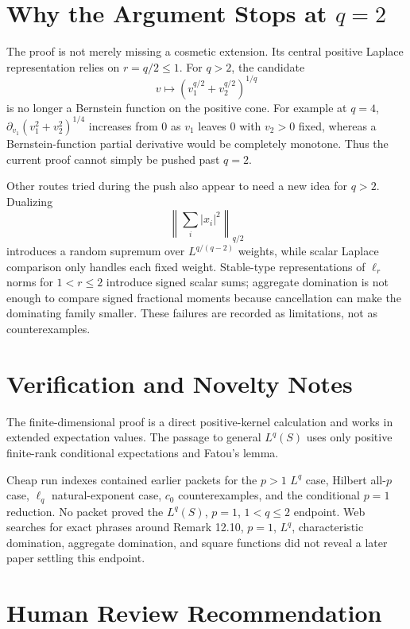 \documentclass[11pt]{article}
\begin{document}
\section*{Why the Argument Stops at \(q=2\)}

The proof is not merely missing a cosmetic extension.  Its central positive
Laplace representation relies on \(r=q/2\le1\).  For \(q>2\), the candidate
\[
  v\mapsto \left(v_1^{q/2}+v_2^{q/2}\right)^{1/q}
\]
is no longer a Bernstein function on the positive cone.  For example at
\(q=4\), \(\partial_{v_1}(v_1^2+v_2^2)^{1/4}\) increases from \(0\) as
\(v_1\) leaves \(0\) with \(v_2>0\) fixed, whereas a Bernstein-function
partial derivative would be completely monotone.  Thus the current proof
cannot simply be pushed past \(q=2\).

Other routes tried during the push also appear to need a new idea for
\(q>2\).  Dualizing
\[
  \left\|\sum_i |x_i|^2\right\|_{q/2}
\]
introduces a random supremum over \(L^{q/(q-2)}\) weights, while scalar
Laplace comparison only handles each fixed weight.  Stable-type
representations of \(\ell_r\) norms for \(1<r\le2\) introduce signed scalar
sums; aggregate domination is not enough to compare signed fractional moments
because cancellation can make the dominating family smaller.  These failures
are recorded as limitations, not as counterexamples.

\section*{Verification and Novelty Notes}

The finite-dimensional proof is a direct positive-kernel calculation and
works in extended expectation values.  The passage to general \(L^q(S)\) uses
only positive finite-rank conditional expectations and Fatou's lemma.

Cheap run indexes contained earlier packets for the \(p>1\) \(L^q\) case,
Hilbert all-\(p\) case, \(\ell_q\) natural-exponent case, \(c_0\)
counterexamples, and the conditional \(p=1\) reduction.
No packet proved the \(L^q(S)\), \(p=1\), \(1<q\le2\) endpoint.  Web searches
for exact phrases around Remark 12.10, \(p=1\), \(L^q\), characteristic
domination, aggregate domination, and square functions did not reveal a later
paper settling this endpoint.

\section*{Human Review Recommendation}
\end{document}
